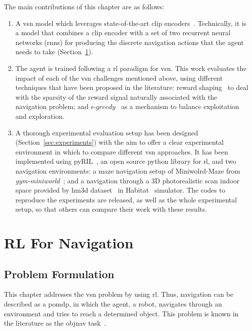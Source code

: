 The main contributions of this chapter are as follows:
\begin{enumerate}
    \item A \acrshort{vsn} model which leverages state-of-the-art \acrfull{clip} encoders~\cite{radford2021}.
    Technically, it is a model that combines a \acrshort{clip} encoder with a set of two recurrent neural networks (\acrshort{rnn}s) for producing the discrete navigation actions that the agent needs to take (Section~\ref{sec:navigation}).
    \item The agent is trained following a \acrshort{rl} paradigm for \acrshort{vsn}.
    This work evaluates the impact of each of the \acrshort{vsn} challenges mentioned above, using different techniques that have been proposed in the literature: reward shaping~\cite{sutton2018, wijmans2020} to deal with the sparsity of the reward signal naturally associated with the navigation problem; and $\epsilon\text{-}greedy$~\cite{mnih2013} as a mechanism to balance exploitation and exploration.
    \item A thorough experimental evaluation setup has been designed (Section~\ref{sec:experiments}) with the aim to offer a clear experimental environment in which to compare different \acrshort{vsn} approaches.
    It has been implemented using pyRIL~\cite{pyRIL}, an open source python library for \acrshort{rl}, and two navigation environments: a maze navigation setup of Miniwolrd-Maze from \textit{gym-miniworld}~\cite{gym_miniworld}; and a navigation through a 3D photorealistic scan indoor space provided by \acrshort{hm3d} dataset~\cite{ramakrishnan2021} in Habitat~\cite{szot2021} simulator.
    The codes to reproduce the experiments are released, as well as the whole experimental setup, so that others can compare their work with these results.
\end{enumerate}


\section{RL For Navigation}\label{sec:navigation}

\subsection{Problem Formulation}\label{subsec:problem-formulation}

This chapter addresses the \acrshort{vsn} problem by using \acrfull{rl}.
Thus, navigation can be described as a \acrfull{pomdp}, in which the agent, \ie a robot, navigates through an environment and tries to reach a determined object.
This problem is known in the literature as the \acrshort{objnav} task~\cite{batra2020}.

